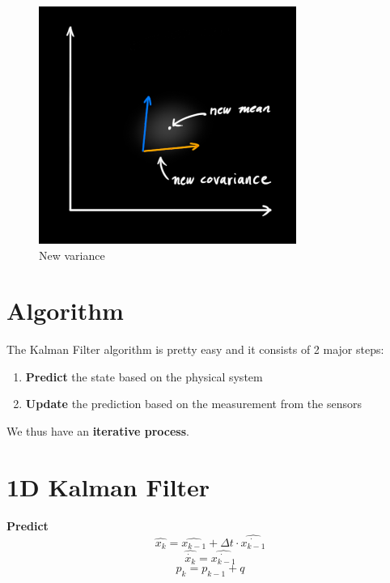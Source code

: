 \documentclass{article}
\begin{document}
\begin{figure}[b]
    \includegraphics[width=0.75\textwidth]{pic3.png}
    \centering
    \caption{New variance}
    \label{fig2}
\end{figure}

\section{Algorithm}
The Kalman Filter algorithm is pretty easy and it consists of 2 major steps:
\begin{enumerate}
    \item \textbf{Predict} the state based on the physical system
    \item \textbf{Update} the prediction based on the measurement from the sensors
\end{enumerate}
We thus have an \textbf{iterative process}.

\section{1D Kalman Filter}

\textbf{Predict}
\begin{equation}
    \hat{x_k} = \hat{x_{k-1}} + \Delta t \cdot \hat{\dot{x_{k-1}}}
\end{equation}
\begin{equation}
    \hat{\dot{x_k}} = \hat{\dot{x_{k-1}}}
\end{equation}
\begin{equation}
    p_k = p_{k-1} + q
\end{equation}
\end{document}
